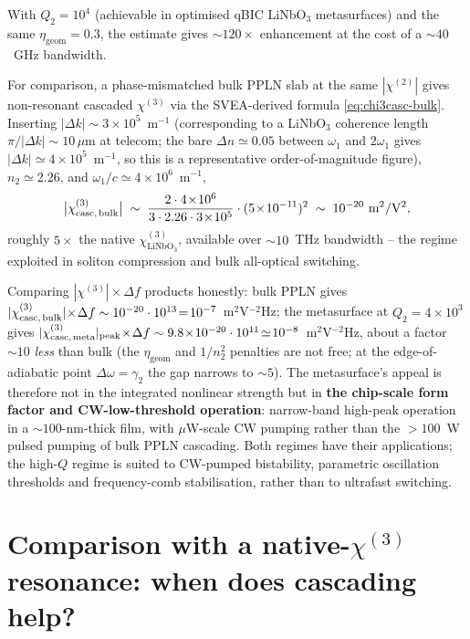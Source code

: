 \documentclass[11pt,a4paper]{article}
\newcommand{\chitwo}{\chi^{(2)}}
\newcommand{\chithree}{\chi^{(3)}}
\newcommand{\Dom}{\Delta\omega}
\begin{document}
With $Q_2=10^{4}$ (achievable in optimised qBIC LiNbO$_3$
metasurfaces) and the same $\eta_\text{geom}=0.3$, the estimate gives
$\sim 120\times$ enhancement at the cost of a $\sim 40$~GHz bandwidth.

For comparison, a phase-mismatched bulk PPLN slab at the same
$|\chitwo|$ gives non-resonant cascaded $\chithree$ via the
SVEA-derived formula \eqref{eq:chi3casc-bulk}.  Inserting
$|\Delta k|\sim 3\!\times\!10^{5}$~m$^{-1}$ (corresponding to a
LiNbO$_3$ coherence length $\pi/|\Delta k|\sim 10\,\mu$m at telecom;
the bare $\Delta n\!\simeq\!0.05$ between $\omega_1$ and $2\omega_1$
gives $|\Delta k|\!\simeq\!4\!\times\!10^{5}$~m$^{-1}$, so this is
a representative order-of-magnitude figure), $n_2\simeq 2.26$, and
$\omega_1/c\simeq 4\!\times\!10^{6}$~m$^{-1}$,
\begin{equation*}
  \bigl|\chithree_\text{casc,\,bulk}\bigr|\;\sim\;
    \frac{2\cdot 4\!\times\!10^{6}}{3\cdot 2.26\cdot 3\!\times\!10^{5}}
    \cdot (5\!\times\!10^{-11})^{2}
  \;\sim\;10^{-20}\ \mathrm{m^{2}/V^{2}},
\end{equation*}
roughly $5\times$ the native $\chithree_\mathrm{LiNbO_3}$, available
over $\sim\!10$~THz bandwidth -- the regime exploited in soliton
compression and bulk all-optical switching.

Comparing $|\chithree|\!\times\!\Delta f$ products honestly: bulk
PPLN gives $|\chithree_\text{casc,\,bulk}|\!\times\!\Delta f\sim
10^{-20}\cdot 10^{13}\!=\!10^{-7}$~m$^{2}$V$^{-2}$Hz;
the metasurface at $Q_2=4{\times}10^{3}$ gives
$|\chithree_\text{casc,\,meta}|_\text{peak}\!\times\!\Delta f\sim
9.8\!\times\!10^{-20}\cdot 10^{11}\!\simeq\!10^{-8}$~m$^{2}$V$^{-2}$Hz,
about a factor $\sim\!10$ \emph{less} than bulk (the $\eta_\text{geom}$
and $1/n_2^{2}$ penalties are not free; at the edge-of-adiabatic point
$\Dom=\gamma_2$ the gap narrows to $\sim\!5$).  The metasurface's appeal
is therefore not in the integrated nonlinear strength but in
\textbf{the chip-scale form factor and CW-low-threshold operation}:
narrow-band high-peak operation in a $\sim 100$-nm-thick film, with
$\mu$W-scale CW pumping rather than the $>\!100$~W pulsed pumping
of bulk PPLN cascading.  Both regimes have their applications; the
high-$Q$ regime is suited to CW-pumped bistability, parametric
oscillation thresholds and frequency-comb stabilisation, rather
than to ultrafast switching.

\section{Comparison with a native-$\chithree$ resonance: when does cascading help?}\label{sec:comparison}
\end{document}
